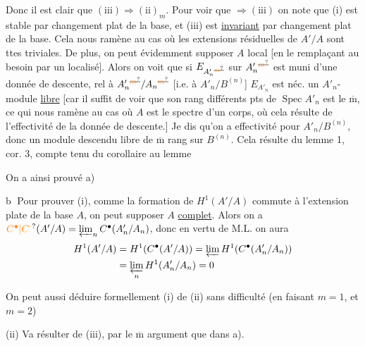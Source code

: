 Donc il est clair que $(\mathrm{iii})\Rightarrow(\mathrm{ii})_m$. Pour voir que
 $\Rightarrow(\mathrm{iii})$ 
on note que (i) est stable par changement
plat de la base, et (iii) est \uline{invariant} par
changement  plat de la base. Cela nous ramène au
cas où les extensions résiduelles de $A'/A$ sont ttes
triviales.  De plus, on peut évidemment
supposer  $A$ local [en le remplaçant au besoin
par un localisé]. Alors on voit que si
$E_{A'_n{}^{\deleted{\unsure{m}}}}$  sur $A'_n{}^{\deleted{\unsure{m}}}$ est muni d'une donnée de
descente,  rel à $A'_n{}^{\deleted{\unsure{m}}}/A_n{}^{\deleted{\unsure{m}}}$
[i.e. à $A'_n/B^{(n)}$]
$E_{A'_n}$ est néc. un $A'_n$-module \uline{libre} [car il
suffit de voir que son rang  différents pts
de $\operatorname{Spec} A'_n$ est le $\overline{\mathrm m}$, ce qui nous ramène au
cas où $A$ est le spectre d'un corps, où cela
résulte de l'effectivité de la donnée de descente.]
Je dis qu'on a effectivité pour $A'_n/B^{(n)}$, donc
un module descendu libre de $\overline{\mathrm m}$ rang sur $B^{(n)}$.
Cela résulte du lemme 1, cor. 3, compte tenu
du corollaire au lemme 

On a ainsi prouvé a)

\textcircled{b} Pour prouver (i), comme la formation de
$H^1(A'/A)$ commute à l'extension plate de la base
$A$, on peut supposer $A$ \uline{complet}. Alors  on a
$\unsure{C^{\bullet}|C^{\cdot}}(A'/A)=\varprojlim_n C^{\bullet}(A'_n/A_n)$, donc en vertu de M.L. on
aura
\[
\begin{aligned}
H^1(A'/A)&=H^1(C^{\bullet}(A'/A))=\varprojlim H^1(C^{\bullet}(A'_n/A_n))\\
&=\varprojlim_n H^1(A'_n/A_n)=0
\end{aligned}
\]

On peut aussi déduire formellement (i) de
(ii) sans difficulté (en faisant $m=1$, et $m=2$)

(ii) Va résulter de (iii), par le $\overline{\mathrm m}$ argument que
dans a).

